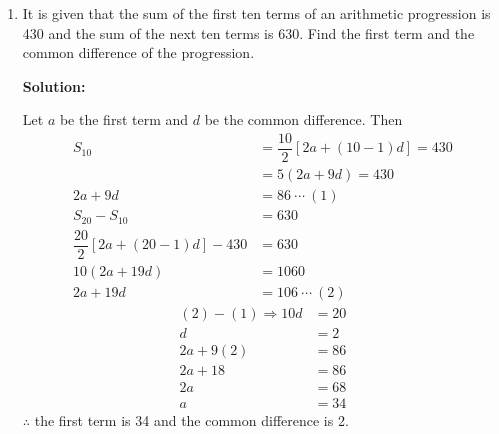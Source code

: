 \documentclass{report}
\newcommand{\sol}{\textbf{Solution:}}
\begin{document}
\begin{enumerate}[leftmargin=*]
\begin{enumerate}
                    \sol{}

                    From the progression, we know that $a=3$, $d=5-3=2$, and $n=25$.
                    \begin{align*}
                        S_{n} & = \dfrac{n}{2}\left[2a + (n-1)d\right]     \\
                              & = \dfrac{25}{2}\left[2(3) + (25-1)2\right] \\
                              & = 675
                    \end{align*}

              \item It is given that the sum of the first ten terms of an arithmetic progression is
                    430 and the sum of the next ten terms is 630. Find the first term and the
                    common difference of the progression.

                    \sol{}

                    Let $a$ be the first term and $d$ be the common difference. Then
                    \begin{align*}
                        S_{10}                                       & = \dfrac{10}{2}\left[2a + (10-1)d\right] = 430 \\
                                                                     & = 5(2a+9d) = 430                               \\
                        2a+9d                                        & = 86\ \cdots\ (1)                              \\
                        S_{20} - S_{10}                              & = 630                                          \\
                        \dfrac{20}{2}\left[2a + (20-1)d\right] - 430 & = 630                                          \\
                        10(2a+19d)                                   & = 1060                                         \\
                        2a+19d                                       & = 106\ \cdots\ (2)
                    \end{align*}
                    \begin{align*}
                        (2) - (1) \Rightarrow 10d & = 20 \\
                        d                         & = 2  \\
                        2a+9(2)                   & = 86 \\
                        2a+18                     & = 86 \\
                        2a                        & = 68 \\
                        a                         & = 34
                    \end{align*}
                    $\therefore$ the first term is 34 and the common difference is 2.
          \end{enumerate}


\end{enumerate}
\end{document}
